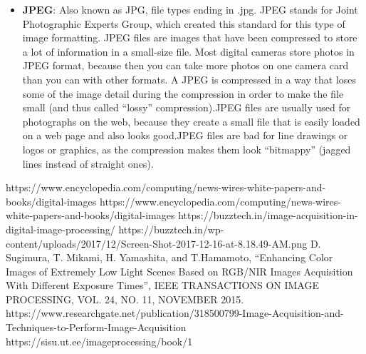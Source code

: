 \documentclass{article}
\begin{document}
\begin{multicols}{2}
\begin{itemize}
                \item \textbf{JPEG}: Also known as JPG, file types ending in .jpg. JPEG stands for Joint Photographic Experts Group, which created this standard for this type of image formatting. JPEG files are images that have been compressed to store a lot of information in a small-size file. Most digital cameras store photos in JPEG format, because then you can take more photos on one camera card than you can with other formats. A JPEG is compressed in a way that loses some of the image detail during the compression in order to make the file small (and thus called “lossy” compression).JPEG files are usually used for photographs on the web, because they create a small file that is easily loaded on a web page and also looks good.JPEG files are bad for line drawings or logos or graphics, as the compression makes them look “bitmappy” (jagged lines instead of straight ones).
            \end{itemize}
    \begin{thebibliography}{7}
	 https://www.encyclopedia.com/computing/news-wires-white-papers-and-books/digital-images
	 https://www.encyclopedia.com/computing/news-wires-white-papers-and-books/digital-images
	 https://buzztech.in/image-acquisition-in-digital-image-processing/
	 https://buzztech.in/wp-content/uploads/2017/12/Screen-Shot-2017-12-16-at-8.18.49-AM.png
     D. Sugimura, T. Mikami, H. Yamashita, and T.Hamamoto, “Enhancing Color Images of Extremely Low Light Scenes Based on RGB/NIR Images Acquisition With Different Exposure Times”, IEEE TRANSACTIONS ON IMAGE PROCESSING, VOL. 24, NO. 11, NOVEMBER 2015.
     https://www.researchgate.net/publication/318500799-Image-Acquisition-and-Techniques-to-Perform-Image-Acquisition
     https://sisu.ut.ee/imageprocessing/book/1
    
    \end{thebibliography}
    \end{multicols}
\end{document}
